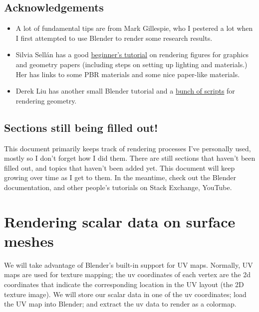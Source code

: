 \documentclass[10pt]{article}
\begin{document}
\subsection{Acknowledgements}
\begin{itemize}
    \item A lot of fundamental tips are from Mark Gillespie, who I pestered a lot when I first attempted to use Blender to render some research results.
    \item Silvia Sell\'an has a good \href{https://www.silviasellan.com/blender_figure.html}{beginner's tutorial} on rendering figures for graphics and geometry papers (including steps on setting up lighting and materials.) Her has links to some PBR materials and some nice paper-like materials.
    \item Derek Liu has another small Blender tutorial and a \href{https://github.com/HTDerekLiu/BlenderToolbox}{bunch of scripts} for rendering geometry.
\end{itemize}

\subsection{Sections still being filled out!}
This document primarily keeps track of rendering processes I've personally used, mostly so I don't forget how I did them. There are still sections that haven't been filled out, and topics that haven't been added yet. This document will keep growing over time as I get to them. In the meantime, check out the Blender documentation, and other people's tutorials on Stack Exchange, YouTube.

\newpage 

\section{Rendering scalar data on surface meshes}
\label{sec:RenderingScalarDataOnSurfaceMeshes}
We will take advantage of Blender's built-in support for UV maps. Normally, UV maps are used for texture mapping; the uv coordinates of each vertex are the 2d coordinates that indicate the corresponding location in the UV layout (the 2D texture image). We will store our scalar data in one of the uv coordinates; load the UV map into Blender; and extract the uv data to render as a colormap.
\end{document}
